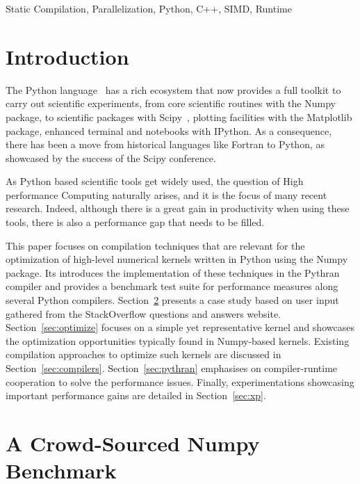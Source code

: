 \documentclass[10pt, preprint]{sigplanconf}
\begin{document}
\keywords
Static Compilation, Parallelization, Python, C++, SIMD, Runtime

\section{Introduction}

The Python language~\cite{rossum97} has a rich ecosystem that now provides a
full toolkit to carry out scientific experiments, from core scientific routines
with the Numpy package\cite{oliphant2007,numpyarray2011}, to scientific
packages with Scipy~\cite{scipy}, plotting facilities with the
Matplotlib package, enhanced terminal and notebooks with IPython. As a
consequence, there has been a move from historical languages like Fortran to
Python, as showcased by the success of the Scipy conference.

As Python based scientific tools get widely used, the question of High
performance Computing naturally arises, and it is the focus of many recent
research. Indeed, although there is a great gain in productivity when using
these tools, there is also a performance gap that needs to be filled.

This paper focuses on compilation techniques that are relevant for the
optimization of high-level numerical kernels written in Python using the Numpy
package. Its introduces the implementation of these techniques in the Pythran
compiler and provides a benchmark test suite for performance measures along
several Python compilers.
Section~\ref{sec:stackoverflow} presents a case study based on user
input gathered from the StackOverflow questions and answers website.
Section~\ref{sec:optimize} focuses on a simple yet representative kernel and
showcases the optimization opportunities typically found in Numpy-based
kernels. Existing compilation approaches to optimize such kernels are discussed
in Section~\ref{sec:compilers}. Section~\ref{sec:pythran} emphasises on
compiler-runtime cooperation to solve the performance issues.
Finally, experimentations showcasing important performance gains are detailed in
Section~\ref{sec:xp}.


\section{A Crowd-Sourced Numpy Benchmark}
\label{sec:stackoverflow}
\end{document}
